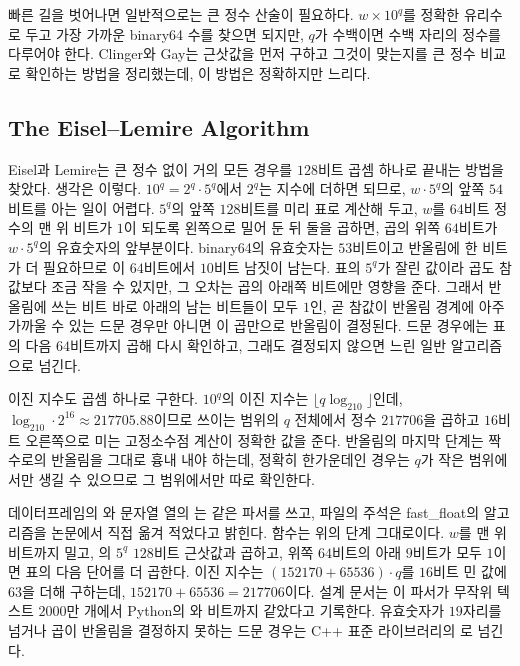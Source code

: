 빠른 길을 벗어나면 일반적으로는 큰 정수 산술이 필요하다. $w\times10^q$를 정확한 유리수로 두고 가장 가까운 binary64 수를 찾으면 되지만, $q$가 수백이면 수백 자리의 정수를 다루어야 한다. Clinger와 Gay는 근삿값을 먼저 구하고 그것이 맞는지를 큰 정수 비교로 확인하는 방법을 정리했는데\cite{clinger1990,gay1990}, 이 방법은 정확하지만 느리다.

\subsection{The Eisel--Lemire Algorithm}

Eisel과 Lemire는 큰 정수 없이 거의 모든 경우를 $128$비트 곱셈 하나로 끝내는 방법을 찾았다\cite{lemire2021parsing}. 생각은 이렇다. $10^q=2^q\cdot5^q$에서 $2^q$는 지수에 더하면 되므로, $w\cdot5^q$의 앞쪽 $54$비트를 아는 일이 어렵다. $5^q$의 앞쪽 $128$비트를 미리 표로 계산해 두고, $w$를 $64$비트 정수의 맨 위 비트가 $1$이 되도록 왼쪽으로 밀어 둔 뒤 둘을 곱하면, 곱의 위쪽 $64$비트가 $w\cdot5^q$의 유효숫자의 앞부분이다. binary64의 유효숫자는 $53$비트이고 반올림에 한 비트가 더 필요하므로 이 $64$비트에서 $10$비트 남짓이 남는다. 표의 $5^q$가 잘린 값이라 곱도 참값보다 조금 작을 수 있지만, 그 오차는 곱의 아래쪽 비트에만 영향을 준다. 그래서 반올림에 쓰는 비트 바로 아래의 남는 비트들이 모두 $1$인, 곧 참값이 반올림 경계에 아주 가까울 수 있는 드문 경우만 아니면 이 곱만으로 반올림이 결정된다. 드문 경우에는 표의 다음 $64$비트까지 곱해 다시 확인하고, 그래도 결정되지 않으면 느린 일반 알고리즘으로 넘긴다.

이진 지수도 곱셈 하나로 구한다. $10^q$의 이진 지수는 $\lfloor q\log_210\rfloor$인데, $\log_210\cdot2^{16}\approx217705.88$이므로 쓰이는 범위의 $q$ 전체에서 정수 $217706$을 곱하고 $16$비트 오른쪽으로 미는 고정소수점 계산이 정확한 값을 준다. 반올림의 마지막 단계는 짝수로의 반올림을 그대로 흉내 내야 하는데, 정확히 한가운데인 경우는 $q$가 작은 범위에서만 생길 수 있으므로 그 범위에서만 따로 확인한다.

\begin{instardust}
데이터프레임의 와 문자열 열의 는 같은 파서를 쓰고, 파일의 주석은 fast\_float의 알고리즘을 논문에서 직접 옮겨 적었다고 밝힌다.  함수는 위의 단계 그대로이다. $w$를 맨 위 비트까지 밀고, 의 $5^q$ $128$비트 근삿값과 곱하고, 위쪽 $64$비트의 아래 $9$비트가 모두 $1$이면 표의 다음 단어를 더 곱한다. 이진 지수는 $(152170+65536)\cdot q$를 $16$비트 민 값에 $63$을 더해 구하는데, $152170+65536=217706$이다. 설계 문서는 이 파서가 무작위 텍스트 $2000$만 개에서 Python의 와 비트까지 같았다고 기록한다. 유효숫자가 $19$자리를 넘거나 곱이 반올림을 결정하지 못하는 드문 경우는 C++ 표준 라이브러리의 로 넘긴다.
\end{instardust}

